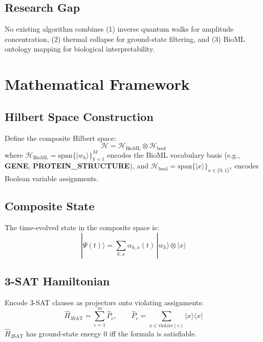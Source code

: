 \documentclass[12pt]{article}
\begin{document}
\subsection{Research Gap}

No existing algorithm combines (1) inverse quantum walks for amplitude concentration,
(2) thermal collapse for ground-state filtering, and (3) BioML ontology mapping for
biological interpretability.

\section{Mathematical Framework}

\subsection{Hilbert Space Construction}

Define the composite Hilbert space:
\begin{equation}
\mathcal{H} = \mathcal{H}_{\mathrm{BioML}} \otimes \mathcal{H}_{\mathrm{bool}}
\end{equation}
where $\mathcal{H}_{\mathrm{BioML}} = \mathrm{span}\{|w_k\rangle\}_{k=1}^M$ encodes the
BioML vocabulary basis (e.g., \textbf{GENE}, \textbf{PROTEIN\_STRUCTURE}), and
$\mathcal{H}_{\mathrm{bool}} = \mathrm{span}\{|x\rangle\}_{x \in \{0,1\}^n}$ encodes
Boolean variable assignments.

\subsection{Composite State}

The time-evolved state in the composite space is:
\begin{equation}
|\Psi(t)\rangle = \sum_{k,x} \alpha_{k,x}(t)\, |w_k\rangle \otimes |x\rangle
\end{equation}

\subsection{3-SAT Hamiltonian}

Encode 3-SAT clauses as projectors onto violating assignments:
\begin{equation}
\hat{H}_{3\mathrm{SAT}} = \sum_{c=1}^m \hat{P}_c, \qquad
\hat{P}_c = \sum_{x \in \mathrm{violate}(c)} |x\rangle\langle x|
\end{equation}
$\hat{H}_{3\mathrm{SAT}}$ has ground-state energy $0$ iff the formula is satisfiable.
\end{document}
